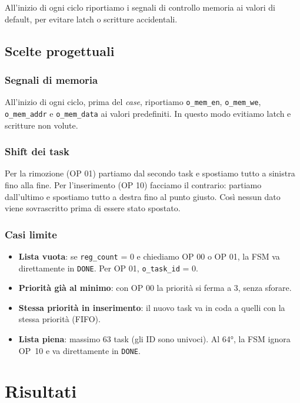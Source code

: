 \documentclass[a4paper,12pt]{article}
\begin{document}
All'inizio di ogni ciclo riportiamo i segnali di controllo memoria ai valori di default, per evitare latch o scritture accidentali.

\subsection{Scelte progettuali}

\subsubsection{Segnali di memoria}

All'inizio di ogni ciclo, prima del \emph{case}, riportiamo \texttt{o\_mem\_en}, \texttt{o\_mem\_we}, \texttt{o\_mem\_addr} e \texttt{o\_mem\_data} ai valori predefiniti. In questo modo evitiamo latch e scritture non volute.

\subsubsection{Shift dei task}

Per la rimozione (OP 01) partiamo dal secondo task e spostiamo tutto a sinistra fino alla fine. Per l'inserimento (OP 10) facciamo il contrario: partiamo dall'ultimo e spostiamo tutto a destra fino al punto giusto. Così nessun dato viene sovrascritto prima di essere stato spostato.

\subsubsection{Casi limite}

\begin{itemize}
    \item \textbf{Lista vuota}: se \texttt{reg\_count} = 0 e chiediamo OP 00 o OP 01, la FSM va direttamente in \texttt{DONE}. Per OP 01, \texttt{o\_task\_id} = 0.
    \item \textbf{Priorità già al minimo}: con OP 00 la priorità si ferma a 3, senza sforare.
    \item \textbf{Stessa priorità in inserimento}: il nuovo task va in coda a quelli con la stessa priorità (FIFO).
    \item \textbf{Lista piena}: massimo 63 task (gli ID sono univoci). Al 64°, la FSM ignora OP~10 e va direttamente in \texttt{DONE}.
\end{itemize}

\newpage
\section{Risultati}
\end{document}
